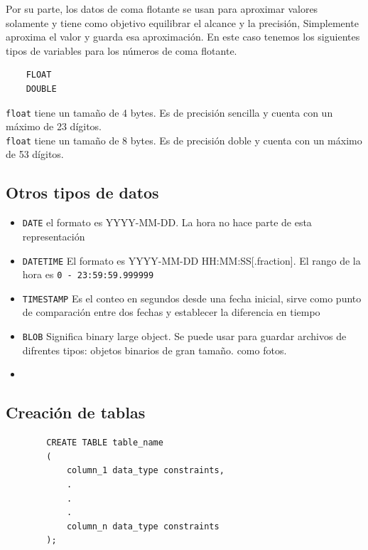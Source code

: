     Por su parte, los datos de coma flotante se usan para aproximar valores solamente y tiene como objetivo equilibrar el alcance y la precisión, Simplemente aproxima el valor y guarda esa aproximación. En este caso tenemos los siguientes tipos de variables para los números de coma flotante.

    \begin{verbatim}
    FLOAT
    DOUBLE
    \end{verbatim}

    \texttt{float} tiene un tamaño de 4 bytes. Es de precisión sencilla y cuenta con un máximo de 23 dígitos.  \\
    \texttt{float} tiene un tamaño de 8 bytes. Es de precisión doble y cuenta con un máximo de 53 dígitos.  \\

    \subsection{Otros tipos de datos}

    \begin{itemize}
        \item \texttt{DATE} el formato es YYYY-MM-DD. La hora no hace parte de esta representación
        \item \texttt{DATETIME} El formato es YYYY-MM-DD HH:MM:SS[.fraction]. El rango de la hora es \texttt{0 - 23:59:59.999999}
        \item \texttt{TIMESTAMP} Es el conteo en segundos desde una fecha inicial, sirve como punto de comparación entre dos fechas y establecer la diferencia en tiempo
        \item \texttt{BLOB} Significa binary large object. Se puede usar para guardar archivos de difrentes tipos: objetos binarios de gran tamaño. como fotos. 
        \item \texttt{}
    \end{itemize}


    
    \subsection{Creación de tablas}
    
    
    \begin{verbatim}
        CREATE TABLE table_name
        (
            column_1 data_type constraints,
            .
            .
            .
            column_n data_type constraints
        );
    \end{verbatim}
    
